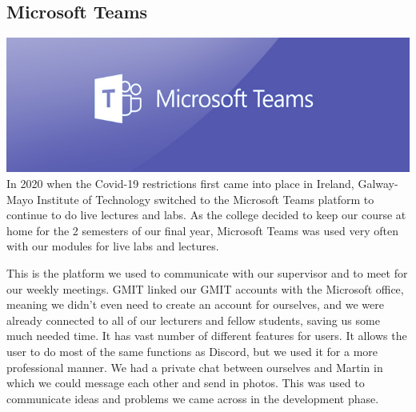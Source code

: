 \subsection{Microsoft Teams}
\includegraphics[scale=0.5]{img/teams-728.jpg}\newline
In 2020 when the Covid-19 restrictions first came into place in Ireland, Galway-Mayo Institute of Technology switched to the Microsoft Teams platform to continue to do live lectures and labs. As the college decided to keep our course at home for the 2 semesters of our final year, Microsoft Teams was used very often with our modules for live labs and lectures. \par
This is the platform we used to communicate with our supervisor and to meet for our weekly meetings. GMIT linked our GMIT accounts with the Microsoft office, meaning we didn't even need to create an account for ourselves, and we were already connected to all of our lecturers and fellow students, saving us some much needed time. It has vast number of different features for users. It allows the user to do most of the same functions as Discord, but we used it for a more professional manner. We had a private chat between ourselves and Martin in which we could message each other and send in photos. This was used to communicate ideas and problems we came across in the development phase. \par

